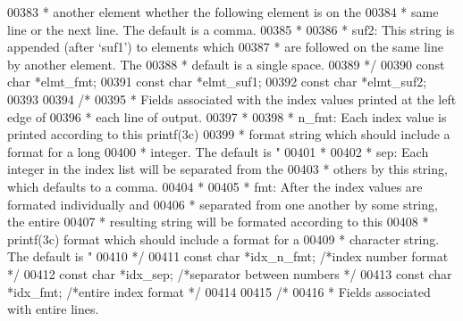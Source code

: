 \begin{DoxyCode}
{{{{{{{{{{{{{{{00383 \textcolor{comment}{     *              another element whether the following element is on the}
00384 \textcolor{comment}{     *              same line or the next line.  The default is a comma.}
00385 \textcolor{comment}{     *}
00386 \textcolor{comment}{     *   suf2:      This string is appended (after `suf1') to elements which}
00387 \textcolor{comment}{     *              are followed on the same line by another element.  The}
00388 \textcolor{comment}{     *              default is a single space.}
00389 \textcolor{comment}{     */}
00390     \textcolor{keyword}{const} \textcolor{keywordtype}{char}  *elmt\_fmt;
00391     \textcolor{keyword}{const} \textcolor{keywordtype}{char}  *elmt\_suf1;
00392     \textcolor{keyword}{const} \textcolor{keywordtype}{char}  *elmt\_suf2;
00393 
00394     \textcolor{comment}{/*}
00395 \textcolor{comment}{     * Fields associated with the index values printed at the left edge of}
00396 \textcolor{comment}{     * each line of output.}
00397 \textcolor{comment}{     *}
00398 \textcolor{comment}{     *   n\_fmt:     Each index value is printed according to this printf(3c)}
00399 \textcolor{comment}{     *              format string which should include a format for a long}
00400 \textcolor{comment}{     *              integer.  The default is "%
00401 \textcolor{comment}{     *}
00402 \textcolor{comment}{     *   sep:       Each integer in the index list will be separated from the}
00403 \textcolor{comment}{     *              others by this string, which defaults to a comma.}
00404 \textcolor{comment}{     *}
00405 \textcolor{comment}{     *   fmt:       After the index values are formated individually and}
00406 \textcolor{comment}{     *              separated from one another by some string, the entire}
00407 \textcolor{comment}{     *              resulting string will be formated according to this}
00408 \textcolor{comment}{     *              printf(3c) format which should include a format for a}
00409 \textcolor{comment}{     *              character string.  The default is "%
00410 \textcolor{comment}{     */}
00411     \textcolor{keyword}{const} \textcolor{keywordtype}{char}  *idx\_n\_fmt;             \textcolor{comment}{/*index number format           */}
00412     \textcolor{keyword}{const} \textcolor{keywordtype}{char}  *idx\_sep;               \textcolor{comment}{/*separator between numbers     */}
00413     \textcolor{keyword}{const} \textcolor{keywordtype}{char}  *idx\_fmt;               \textcolor{comment}{/*entire index format           */}
00414 
00415     \textcolor{comment}{/*}
00416 \textcolor{comment}{     * Fields associated with entire lines.}
}}}}}}}}}}}}}}}}}
\end{DoxyCode}
